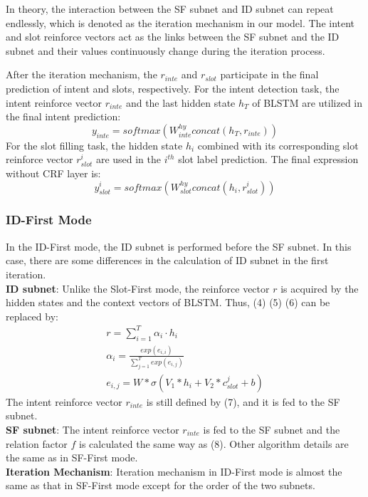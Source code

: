 \documentclass[11pt,a4paper]{article}
\begin{document}
In theory, the interaction between the SF subnet and ID subnet can repeat endlessly, which is denoted as the iteration mechanism in our model. The intent and slot reinforce vectors act as the links between the SF subnet and the ID subnet and their values continuously change during the iteration process.

After the iteration mechanism, the $r_{inte}$ and $r_{slot}$ participate in the final prediction of intent and slots, respectively. For the intent detection task, the intent reinforce vector $r_{inte}$ and the last hidden state $h_T$ of BLSTM are utilized in the final intent prediction:
\begin{equation}
y_{inte}=softmax(W_{inte}^{hy}concat(h_T,r_{inte}))
\end{equation}
For the slot filling task, the hidden state $h_i$ combined with its corresponding slot reinforce vector $r_{slot}^i$ are used in the $i^{th}$ slot label prediction. The final expression without CRF layer is:
\begin{equation}
y_{slot}^i=softmax(W_{slot}^{hy}concat(h_i,r_{slot}^i))
\end{equation}
\subsubsection{ID-First Mode}
In the ID-First mode, the ID subnet is performed before the SF subnet. In this case, there are some differences in the calculation of ID subnet in the first iteration.\\
\textbf{ID subnet}: Unlike the Slot-First mode, the reinforce vector $r$ is acquired by the hidden states and the context vectors of BLSTM. Thus, (4) (5) (6) can be replaced by:
\begin{gather} 
r=\sum_{i=1}^{T}{\alpha_i\cdot h_i}\\
\alpha_i=\frac{exp(e_{i,i})}{\sum^T_{j=1}exp(e_{i,j})}\\
e_{i,j}=W*\sigma(V_1*h_i+V_2*c_{slot}^{j}+b) 
\end{gather}
The intent reinforce vector $r_{inte}$ is still defined by (7), and it is fed to the SF subnet.\\
\textbf{SF subnet}: The intent reinforce vector $r_{inte}$ is fed to the SF subnet and the relation factor $f$ is calculated the same way as (8).
Other algorithm details are the same as in SF-First mode.\\
\textbf{Iteration Mechanism}: Iteration mechanism in ID-First mode is almost the same as that in SF-First mode except for the order of the two subnets. 
\end{document}
